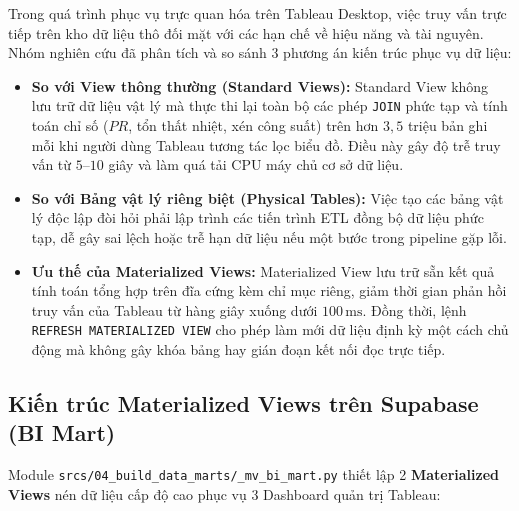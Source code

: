 \documentclass[12pt, a4paper]{report}
\begin{document}
Trong quá trình phục vụ trực quan hóa trên Tableau Desktop, việc truy vấn trực tiếp trên kho dữ liệu thô đối mặt với các hạn chế về hiệu năng và tài nguyên. Nhóm nghiên cứu đã phân tích và so sánh 3 phương án kiến trúc phục vụ dữ liệu:

\begin{itemize}[leftmargin=*]
    \item \textbf{So với View thông thường (Standard Views):} Standard View không lưu trữ dữ liệu vật lý mà thực thi lại toàn bộ các phép \texttt{JOIN} phức tạp và tính toán chỉ số ($PR$, tổn thất nhiệt, xén công suất) trên hơn $3{,}5$ triệu bản ghi mỗi khi người dùng Tableau tương tác lọc biểu đồ. Điều này gây độ trễ truy vấn từ $5$--$10$ giây và làm quá tải CPU máy chủ cơ sở dữ liệu.
    \item \textbf{So với Bảng vật lý riêng biệt (Physical Tables):} Việc tạo các bảng vật lý độc lập đòi hỏi phải lập trình các tiến trình ETL đồng bộ dữ liệu phức tạp, dễ gây sai lệch hoặc trễ hạn dữ liệu nếu một bước trong pipeline gặp lỗi.
    \item \textbf{Ưu thế của Materialized Views:} Materialized View lưu trữ sẵn kết quả tính toán tổng hợp trên đĩa cứng kèm chỉ mục riêng, giảm thời gian phản hồi truy vấn của Tableau từ hàng giây xuống dưới $100\,\text{ms}$. Đồng thời, lệnh \texttt{REFRESH MATERIALIZED VIEW} cho phép làm mới dữ liệu định kỳ một cách chủ động mà không gây khóa bảng hay gián đoạn kết nối đọc trực tiếp.
\end{itemize}

\subsection{Kiến trúc Materialized Views trên Supabase (BI Mart)}

Module \texttt{srcs/04\_build\_data\_marts/\_mv\_bi\_mart.py} thiết lập 2 \textbf{Materialized Views} nén dữ liệu cấp độ cao phục vụ 3 Dashboard quản trị Tableau:
\end{document}
